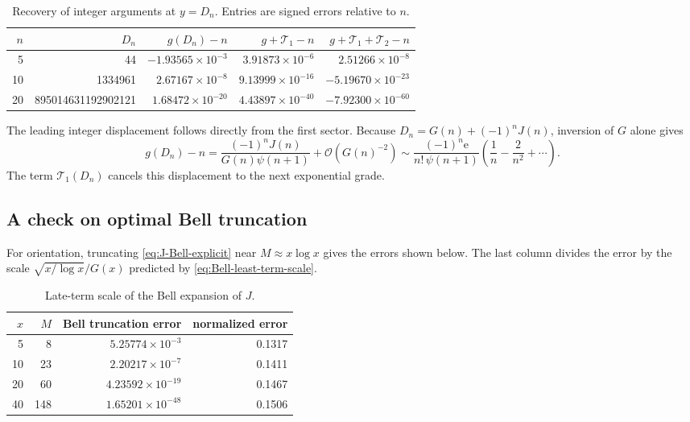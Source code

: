 \documentclass[11pt,oneside]{article}
\theoremstyle{plain}
\theoremstyle{definition}
\theoremstyle{remark}
\newcommand{\ee}{\mathrm{e}}
\newcommand{\Tcal}{\mathcal{T}}
\newcommand{\bigO}{\mathcal{O}}
\begin{document}
\begin{table}[htbp]
\centering
\small
\caption{Recovery of integer arguments at \(y=D_n\).  Entries are signed
errors relative to \(n\).}
\label{tab:integer-numerics}
\begin{tabular}{@{}r r r r r@{}}
\toprule
\(n\) & \(D_n\) & \(g(D_n)-n\) & \(g+\Tcal_1-n\) &
\(g+\Tcal_1+\Tcal_2-n\) \\
\midrule
5 & 44 & \(-1.93565\times10^{-3}\) & \(3.91873\times10^{-6}\) &
\(2.51266\times10^{-8}\) \\
10 & 1334961 & \(2.67167\times10^{-8}\) & \(9.13999\times10^{-16}\) &
\(-5.19670\times10^{-23}\) \\
20 & 895014631192902121 & \(1.68472\times10^{-20}\) &
\(4.43897\times10^{-40}\) & \(-7.92300\times10^{-60}\) \\
\bottomrule
\end{tabular}
\end{table}

The leading integer displacement follows directly from the first sector.
Because \(D_n=G(n)+(-1)^nJ(n)\), inversion of \(G\) alone gives
\begin{equation}
 g(D_n)-n
 =\frac{(-1)^nJ(n)}{G(n)\psi(n+1)}
 +\bigO(G(n)^{-2})
 \sim \frac{(-1)^n\ee}{n!\,\psi(n+1)}
 \left(\frac1n-\frac2{n^2}+\cdots\right).
 \label{eq:integer-displacement}
\end{equation}
The term \(\Tcal_1(D_n)\) cancels this displacement to the next exponential
grade.

\subsection{A check on optimal Bell truncation}

For orientation, truncating \eqref{eq:J-Bell-explicit} near
\(M\approx x\log x\) gives the errors shown below.  The last column divides
the error by the scale \(\sqrt{x/\log x}/G(x)\) predicted by
\eqref{eq:Bell-least-term-scale}.

\begin{table}[htbp]
\centering
\small
\caption{Late-term scale of the Bell expansion of \(J\).}
\label{tab:Bell-late-numerics}
\begin{tabular}{@{}r r r r@{}}
\toprule
\(x\) & \(M\) & Bell truncation error & normalized error \\
\midrule
5  & 8   & \(5.25774\times10^{-3}\)  & 0.1317 \\
10 & 23  & \(2.20217\times10^{-7}\)  & 0.1411 \\
20 & 60  & \(4.23592\times10^{-19}\) & 0.1467 \\
40 & 148 & \(1.65201\times10^{-48}\) & 0.1506 \\
\bottomrule
\end{tabular}
\end{table}
\end{document}
